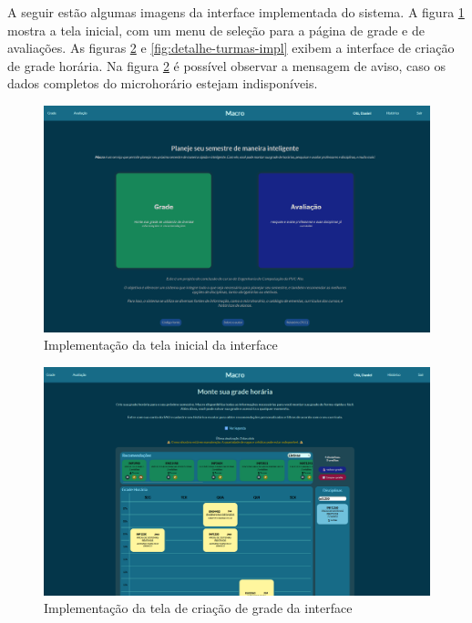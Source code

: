 A seguir estão algumas imagens da interface implementada do sistema. A figura \ref{fig:tela-inicial-impl} mostra a tela inicial, com um menu de seleção para a página de grade e de avaliações. As figuras \ref{fig:tela-grade-impl} e \ref{fig:detalhe-turmas-impl} exibem a interface de criação de grade horária. 
Na figura \ref{fig:tela-grade-impl} é possível observar a mensagem de aviso, caso os dados completos do microhorário estejam indisponíveis.

\begin{figure}[ht]
    \begin{center}
    \includegraphics[width=360pt]{figuras/tela-inicial.png}
    \caption{Implementação da tela inicial da interface}
    \label{fig:tela-inicial-impl}
    \end{center}
\end{figure}

\begin{figure}[ht]
    \begin{center}
    \includegraphics[width=360pt]{figuras/tela-grade.png}
    \caption{Implementação da tela de criação de grade da interface}
    \label{fig:tela-grade-impl}
    \end{center}
\end{figure}

